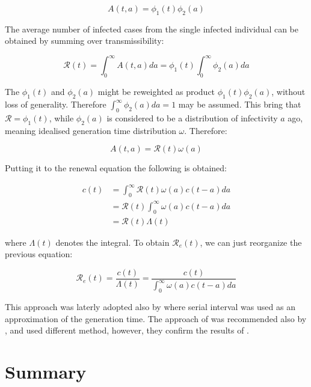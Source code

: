 \documentclass[
  digital, %
  oneside, %
  lof,     %
  lot,     %
]{fithesis4}
\begin{document}
\begin{equation}
A(t, a) = \phi_1(t) \phi_2(a)
\end{equation}

The average number of infected cases from the single infected 
individual can be obtained by summing over transmissibility:

\begin{equation}
  \mathcal{R}(t) = \int^{\infty}_0 A(t, a) da = \phi_1(t) \int^{\infty}_0 \phi_2(a) da
\end{equation}

The $\phi_1(t)$ and $\phi_2(a)$ might be reweighted as 
product $\phi_1(t) \phi_2(a)$, without loss of generality. 
Therefore $\int^{\infty}_0 \phi_2(a) da = 1$ may be assumed. 
This bring that $\mathcal{R} = \phi_1(t)$, while $\phi_2(a)$ 
is considered to be a distribution of infectivity $a$ ago, 
meaning idealised generation time distribution $\omega$. 
Therefore:

\begin{equation}
A(t, a) = \mathcal{R}(t) \omega(a)
\end{equation}

Putting it to the renewal equation the following is obtained:

\begin{equation}
  \begin{split}
    c(t) & = \int^{\infty}_0 \mathcal{R}(t) \omega(a) c(t - a) da \\
    & = \mathcal{R}(t) \int^{\infty}_0 \omega(a) c(t - a) da\\
    & = \mathcal{R}(t) \Lambda(t)    
  \end{split}
\end{equation}

where $\Lambda(t)$ denotes the integral.
To obtain $\mathcal{R}_e(t)$, we can just reorganize the previous equation:

\begin{equation}\label{eq:fraser-Re}
  \mathcal{R}_e(t) = \frac{c(t)}{\Lambda(t)} = \frac{c(t)}{\int^{\infty}_0 \omega(a) c(t - a) da}
\end{equation}

This approach was laterly adopted also by \cite{cori2013} where serial 
interval was used as an approximation of the generation time.
The approach of \cite{cori2013} was recommended also by \cite{gostic2020},
and \cite{hasan2020} used different method, however, they confirm the 
results of \cite{cori2013}.


\section{Summary}
\end{document}
